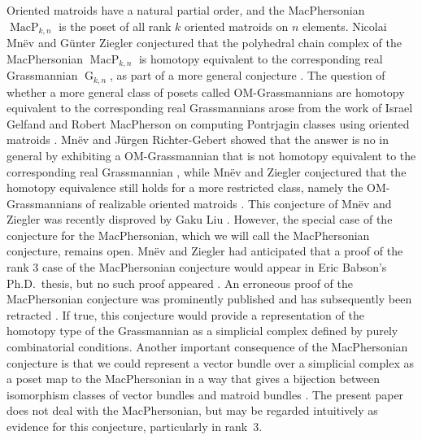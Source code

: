 \documentclass[JEP,XML,SOM,Unicode,NoFloatCountersInSection,published]{cedram}
\theoremstyle{remark}
\DeclareMathOperator{\g}{G}
\DeclareMathOperator{\mcp}{MacP}
\begin{document}
Oriented matroids have a natural partial order, and the MacPhersonian $\mcp_{k,n}$ is the poset of all rank $k$ oriented matroids on $n$ elements.
Nicolai Mnëv and Günter Ziegler conjectured that the polyhedral chain complex of the MacPhersonian $\mcp_{k,n}$ is homotopy equivalent to the corresponding real Grassmannian $\g_{k,n}$, as part of a more general conjecture \cite{mnev1993combinatorial}.
The question of whether a more general class of posets called OM-Grassmannians are homotopy equivalent to the corresponding real Grassmannians
arose from the work of Israel Gelfand and Robert MacPherson on computing Pontrjagin classes using oriented matroids \cite{gelfand1992combinatorial}.
Mnëv and Jürgen Richter-Gebert showed that the answer is no in general by exhibiting a OM-Grassmannian that is not homotopy equivalent to the corresponding real Grassmannian \cite{mnev1993two}, while
Mnëv and Ziegler conjectured that the homotopy equivalence still holds for a more restricted class, namely the OM-Grassmannians of realizable oriented matroids \cite{mnev1993combinatorial}.
This conjecture of Mnëv and Ziegler was recently
disproved by Gaku Liu \cite{liu2020counterexample}.
However, the special case of the conjecture for the MacPhersonian, which we will call the MacPhersonian conjecture, remains open.
Mnëv and Ziegler had anticipated that a proof of the rank $3$ case of the MacPhersonian conjecture would appear in Eric Babson's Ph.D.\ thesis, but no such proof appeared \cite{mnev1993combinatorial,babson1993combinatorial}.
An erroneous proof of the MacPhersonian conjecture was prominently published and has subsequently been retracted \cite{biss2003homotopy,biss2009erratum}.
If true, this conjecture would provide a representation of the homotopy type of the Grassmannian as a simplicial complex defined by purely combinatorial conditions.
Another important consequence of the MacPhersonian conjecture is that we could represent a vector bundle over a simplicial complex as a poset map to the MacPhersonian in a way that gives a bijection between isomorphism classes of vector bundles and matroid bundles \cite{anderson2002mod,anderson1999matroid}.
The present paper does not deal with the MacPhersonian, but may be regarded intuitively as evidence for this conjecture, particularly in rank~$3$.
\end{document}
